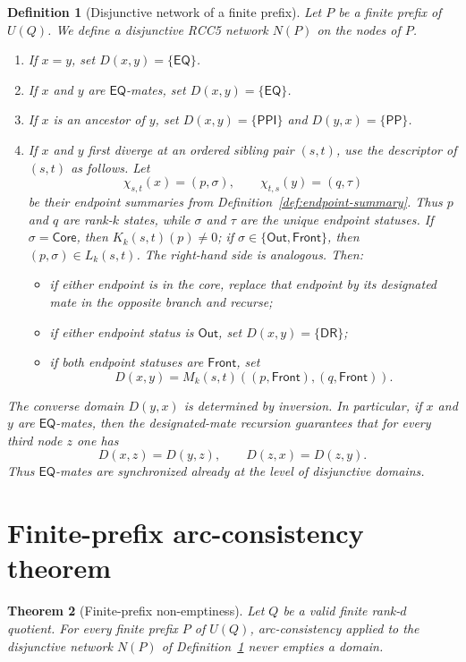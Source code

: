 \documentclass[11pt]{article}
\newtheorem{definition}{Definition}[section]
\newtheorem{theorem}[definition]{Theorem}
\theoremstyle{remark}
\newcommand{\DR}{\mathsf{DR}}
\newcommand{\PP}{\mathsf{PP}}
\newcommand{\PPI}{\mathsf{PPI}}
\newcommand{\EQ}{\mathsf{EQ}}
\newcommand{\Core}{\mathsf{Core}}
\newcommand{\Out}{\mathsf{Out}}
\newcommand{\Front}{\mathsf{Front}}
\begin{document}
\begin{definition}[Disjunctive network of a finite prefix]\label{def:network}
Let $P$ be a finite prefix of $U(Q)$. We define a disjunctive RCC5 network $N(P)$ on the nodes of $P$.
\begin{enumerate}[label=(\roman*)]
    \item If $x=y$, set $D(x,y)=\{\EQ\}$.
    \item If $x$ and $y$ are $\EQ$-mates, set $D(x,y)=\{\EQ\}$.
    \item If $x$ is an ancestor of $y$, set $D(x,y)=\{\PPI\}$ and $D(y,x)=\{\PP\}$.
    \item If $x$ and $y$ first diverge at an ordered sibling pair $(s,t)$, use the descriptor of $(s,t)$ as follows. Let
    \[
    \chi_{s,t}(x)=(p,\sigma),\qquad \chi_{t,s}(y)=(q,\tau)
    \]
    be their endpoint summaries from Definition~\ref{def:endpoint-summary}. Thus $p$ and $q$ are rank-$k$ states, while $\sigma$ and $\tau$ are the unique endpoint statuses. If $\sigma=\Core$, then $K_k(s,t)(p)\neq 0$; if $\sigma\in\{\Out,\Front\}$, then $(p,\sigma)\in L_k(s,t)$. The right-hand side is analogous.
    Then:
    \begin{itemize}
        \item if either endpoint is in the core, replace that endpoint by its designated mate in the opposite branch and recurse;
        \item if either endpoint status is $\Out$, set $D(x,y)=\{\DR\}$;
        \item if both endpoint statuses are $\Front$, set
        \[
        D(x,y)=M_k(s,t)((p,\Front),(q,\Front)).
        \]
    \end{itemize}
\end{enumerate}
The converse domain $D(y,x)$ is determined by inversion. In particular, if $x$ and $y$ are $\EQ$-mates, then the designated-mate recursion guarantees that for every third node $z$ one has
\[
D(x,z)=D(y,z),\qquad D(z,x)=D(z,y).
\]
Thus $\EQ$-mates are synchronized already at the level of disjunctive domains.
\end{definition}

\section{Finite-prefix arc-consistency theorem}

\begin{theorem}[Finite-prefix non-emptiness]\label{thm:finite-prefix}
Let $Q$ be a valid finite rank-$d$ quotient. For every finite prefix $P$ of $U(Q)$, arc-consistency applied to the disjunctive network $N(P)$ of Definition~\ref{def:network} never empties a domain.
\end{theorem}
\end{document}
